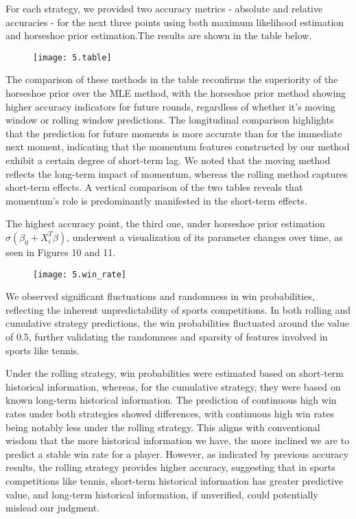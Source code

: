 \documentclass{mcmthesis}
\begin{document}
For each strategy, we provided two accuracy metrics - absolute and relative accuracies - for the next three points using both maximum likelihood estimation and horseshoe prior estimation.The results are shown in the table below.
\begin{figure}[ht]
  \small
  \centering
  \texttt{[image: 5.table]}
\end{figure}

The comparison of these methods in the table reconfirms the superiority of the horseshoe prior over the MLE method, with the horseshoe prior method showing higher accuracy indicators for future rounds, regardless of whether it's moving window or rolling window predictions. The longitudinal comparison highlights that the prediction for future moments is more accurate than for the immediate next moment, indicating that the momentum features constructed by our method exhibit a certain degree of short-term lag. We noted that the moving method reflects the long-term impact of momentum, whereas the rolling method captures short-term effects. A vertical comparison of the two tables reveals that momentum's role is predominantly manifested in the short-term effects.

The highest accuracy point, the third one, under horseshoe prior estimation $\sigma(\beta_0 + X_i^T\beta)$, underwent a visualization of its parameter changes over time, as seen in Figures 10 and 11.
\begin{figure}[ht]%
  \small
  \centering
  \texttt{[image: 5.win\_rate]}
\end{figure}

We observed significant fluctuations and randomness in win probabilities, reflecting the inherent unpredictability of sports competitions. In both rolling and cumulative strategy predictions, the win probabilities fluctuated around the value of 0.5, further validating the randomness and sparsity of features involved in sports like tennis.

Under the rolling strategy, win probabilities were estimated based on short-term historical information, whereas, for the cumulative strategy, they were based on known long-term historical information. The prediction of continuous high win rates under both strategies showed differences, with continuous high win rates being notably less under the rolling strategy. This aligns with conventional wisdom that the more historical information we have, the more inclined we are to predict a stable win rate for a player. However, as indicated by previous accuracy results, the rolling strategy provides higher accuracy, suggesting that in sports competitions like tennis, short-term historical information has greater predictive value, and long-term historical information, if unverified, could potentially mislead our judgment.
\end{document}
